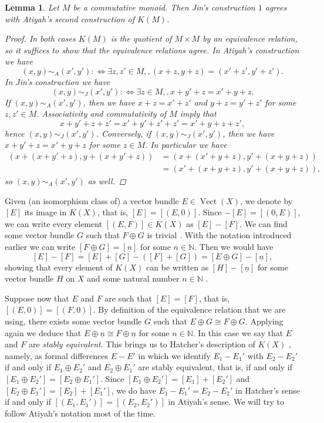 \documentclass[12pt,a4paper]{amsart}
\theoremstyle{plain}
\newtheorem{lm}[thm]{Lemma}
\theoremstyle{definition}
\theoremstyle{remark}
\begin{document}
\begin{lm}
  Let $M$ be a commutative monoid.
  Then Jin's construction $1$ agrees with Atiyah's second construction of $K(M)$.
  \begin{proof}
    In both cases $K(M)$ is the quotient of $M \times M$ by an equivalence relation, so it suffices to show that the equivalence relations agree.
    In Atiyah's construction we have
    \[ (x,y) \sim_{A} (x', y') : \Leftrightarrow \exists z , z' \in M,, (x + z, y + z) = (x' + z', y' + z'). \]
    In Jin's construction we have
    \[ (x,y) \sim_{J} (x', y') : \Leftrightarrow \exists z \in M,, x + y' + z = x' + y + z. \]
    If $(x, y) \sim_{A} (x', y')$, then we have $x + z = x' + z'$ and $y + z = y' + z'$ for some $z, z' \in M$. 
    Associativity and commutativity of $M$ imply that
    \[ x + y' + z + z' = x' + y' + z' + z' = x' + y + z + z', \]
    hence $(x, y) \sim_{J} (x', y')$.
    Conversely, if $(x, y) \sim_{J} (x', y')$, then we have $x + y' + z = x' + y + z$ for some $z \in M$.
    In particular we have
    \begin{align*}
      (x + (x + y' + z), y + (x + y' + z)) & = (x + (x' + y + z), y' + (x + y + z)) \\
      & = (x' + (x + y + z), y' + (x + y + z)),
    \end{align*}
    so $(x, y) \sim_{A} (x', y')$ as well.
  \end{proof}
\end{lm}

Given (an isomorphism class of) a vector bundle $E \in \operatorname{Vect}(X)$, we denote by $[E]$ its image in $K(X)$, that is, $[E] = [(E, 0)]$.
Since $-[E] = [(0,E)]$, we can write every element $[(E,F)] \in K(X)$ as $[E] - [F]$.
We can find some vector bundle $G$ such that $F \oplus G$ is trivial \cite[Corollary 1.4.14]{ati67}.
With the notation introduced earlier we can write $[F \oplus G] = [\underline{n}]$ for some $n \in \mathbb{N}$.
Then we would have
\[ [E] - [F] = [E] + [G] - ([F] + [G]) = [E \oplus G] - [\underline{n}], \]
showing that every element of $K(X)$ can be written as $[H] - [\underline{n}]$ for some vector bundle $H$ on $X$ and some natural number $n \in \mathbb{N}$ \cite[p.~44]{ati67}.

Suppose now that $E$ and $F$ are such that $[E] = [F]$, that is, $[(E,0)] = [(F,0)]$.
By definition of the equivalence relation that we are using, there exists some vector bundle $G$ such that $E \oplus G \cong F \oplus G$.
Applying \cite[Corollary 1.4.14]{ati67} again we deduce that $E \oplus \underline{n} \cong F \oplus \underline{n}$ for some $n \in \mathbb{N}$.
In this case we say that $E$ and $F$ are \textit{stably equivalent}.
This brings us to Hatcher's description of $K(X)$ \cite[p.~39]{hat03}, namely, as formal differences $E - E'$ in which we identify $E_{1} - E_{1}'$ with $E_{2} - E_{2}'$ if and only if $E_{1} \oplus E_{2}'$ and $E_{2} \oplus E_{1}'$ are stably equivalent, that is, if and only if $[E_{1} \oplus E_{2}'] = [E_{2} \oplus E_{1}']$.
Since $[E_{1} \oplus E_{2}'] = [E_{1}] + [E_{2}']$ and $[E_{2} \oplus E_{1}'] = [E_{2}] + [E_{1}']$, we do have $E_{1} - E_{1}' = E_{2} - E_{2}'$ in Hatcher's sense if and only if $[(E_{1},E_{1}')] = [(E_{2},E_{2}')]$ in Atiyah's sense.
We will try to follow Atiyah's notation most of the time.



\vfill
\end{document}
